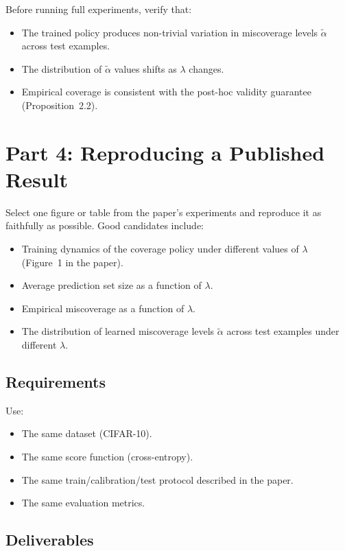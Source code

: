 \documentclass[11pt]{article}
\begin{document}
Before running full experiments, verify that:
\begin{itemize}
  \item The trained policy produces non-trivial variation in miscoverage
  levels $\tilde\alpha$ across test examples.
  \item The distribution of $\tilde\alpha$ values shifts as $\lambda$
  changes.
  \item Empirical coverage is consistent with the post-hoc validity
  guarantee (Proposition~2.2).
\end{itemize}

\section{Part 4: Reproducing a Published Result}

Select one figure or table from the paper's experiments and reproduce it
as faithfully as possible. Good candidates include:

\begin{itemize}
  \item Training dynamics of the coverage policy under different values
  of $\lambda$ (Figure~1 in the paper).
  \item Average prediction set size as a function of $\lambda$.
  \item Empirical miscoverage as a function of $\lambda$.
  \item The distribution of learned miscoverage levels $\tilde\alpha$
  across test examples under different $\lambda$.
\end{itemize}

\subsection{Requirements}

Use:
\begin{itemize}
  \item The same dataset (CIFAR-10).
  \item The same score function (cross-entropy).
  \item The same train/calibration/test protocol described in the paper.
  \item The same evaluation metrics.
\end{itemize}

\subsection{Deliverables}
\end{document}
